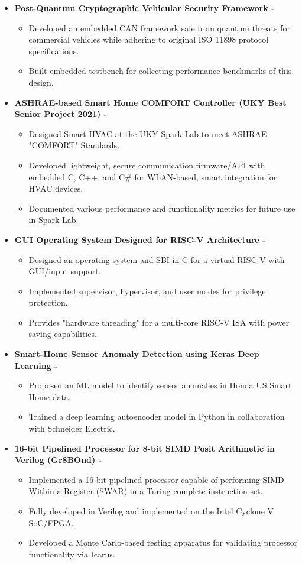 \documentclass[line,margin,9pt]{res}
\begin{document}
\begin{resume}
\begin{itemize}
\item \textbf{Post-Quantum Cryptographic Vehicular Security Framework -} 
\begin{itemize}
\item Developed an embedded CAN framework safe from quantum threats for commercial vehicles while adhering to original ISO 11898 protocol specifications.
\item Built embedded testbench for collecting performance benchmarks of this design.
\end{itemize}

\item \textbf{ASHRAE-based Smart Home COMFORT Controller (UKY Best Senior Project 2021) -}
\begin{itemize}
\item Designed Smart HVAC at the UKY Spark Lab to meet ASHRAE "COMFORT" Standards.
\item Developed lightweight, secure communication firmware/API with embedded C, C++, and C\# for WLAN-based, smart integration for HVAC devices.
\item Documented various performance and functionality metrics for future use in Spark Lab.
\end{itemize}

\item \textbf{GUI Operating System Designed for RISC-V Architecture -} 
\begin{itemize}
\item Designed an operating system and SBI in C for a virtual RISC-V with GUI/input support.
\item Implemented supervisor, hypervisor, and user modes for privilege protection.
\item Provides "hardware threading" for a multi-core RISC-V ISA with power saving capabilities.
\end{itemize}

\item \textbf{Smart-Home Sensor Anomaly Detection using Keras Deep Learning -} 
\begin{itemize}
\item Proposed an ML model to identify sensor anomalies in Honda US Smart Home data.
\item Trained a deep learning autoencoder model in Python in collaboration with Schneider Electric.
\end{itemize}

\item \textbf{16-bit Pipelined Processor for 8-bit SIMD Posit Arithmetic in Verilog (Gr8BOnd) -} 
\begin{itemize}
\item Implemented a 16-bit pipelined processor capable of performing SIMD Within a Register (SWAR) in a Turing-complete instruction set.
\item Fully developed in Verilog and implemented on the Intel Cyclone V SoC/FPGA.
\item Developed a Monte Carlo-based testing apparatus for validating processor functionality via Icarus.
\end{itemize}


\end{itemize}
\end{resume}
\end{document}
